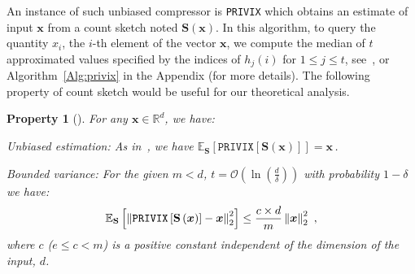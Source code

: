 \documentclass[11pt]{article}
\newtheorem{property}{Property}
\begin{document}
An instance of such unbiased compressor is \texttt{PRIVIX} which obtains an estimate of input $\boldsymbol{x}$ from a count sketch noted $\boldsymbol{S}(\boldsymbol{x})$. 
In this algorithm, to query the quantity $x_i$, the $i$-th element of the vector $\boldsymbol{x}$, we compute the median of $t$ approximated values specified by the indices of $h_j(i)$ for $1\leq j\leq t$, see~\citep{li2019privacy}, or Algorithm~\ref{Alg:privix} in the Appendix (for more details).
The following property of count sketch would be useful for our theoretical analysis.
\begin{property}[\cite{li2019privacy}]
For any $\boldsymbol{x}\in \mathbb{R}^{d}$, we have:

\textit{Unbiased estimation}: As in~\cite{li2019privacy}, we have $ \mathbb{E}_{\mathbf{S}}\left[\texttt{PRIVIX}\left[\mathbf{S}\left(\boldsymbol{x}\right)\right]\right]=\boldsymbol{x}\, $.

\textit{Bounded variance:} For the given $m<d$, $t=\mathcal{O}\left(\ln \left(\frac{d}{\delta}\right)\right)$ with probability $1-\delta$ we have:
    \begin{align}\notag
        \mathbb{E}_{\mathbf{S}}\left[\left\|\texttt{PRIVIX}\left[\mathbf{S}\left(\boldsymbol{x}\right)\right]-\boldsymbol{x}\right\|_2^2\right] \leq \frac{c\times d}{m}\left\|\boldsymbol{x}\right\|_2^2\ , 
    \end{align}
 where $c$ ($e\leq c<m$) is a positive constant independent of the dimension of the input, $d$.
\end{property}
\end{document}
